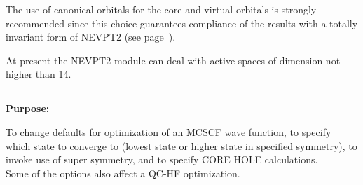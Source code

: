 


The use of canonical orbitals for the core and virtual orbitals is
strongly recommended since this choice guarantees compliance of the
results with a totally invariant form of NEVPT2 (see page~\pageref{ch:nevpt2}).

At present the NEVPT2 module can deal with active spaces of dimension
not higher than 14.

\pagebreak[3]
\subsection{\label{ref-optinp}}

{\bf Purpose:}

To change defaults for optimization of an MCSCF wave function,
to specify which state to converge to (lowest state or higher state in specified symmetry),
to invoke use of super symmetry,
and to specify CORE HOLE calculations.\\
Some of the options also affect a QC-HF optimization.

